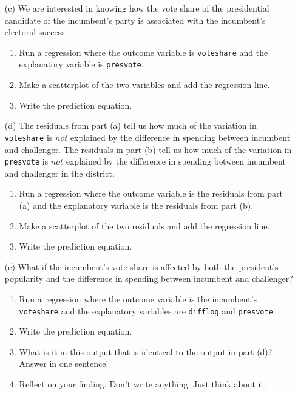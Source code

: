 \documentclass[12pt,letterpaper]{article}
\begin{document}
\begin{enumerate}
\newpage	
\item [(c)] We are interested in knowing how the vote share of the presidential candidate of the incumbent's party is associated with the incumbent's electoral success.
	\begin{enumerate}
		\item Run a regression where the outcome variable is \texttt{voteshare} and the explanatory variable is \texttt{presvote}.
		\item Make a scatterplot of the two variables and add the regression line. 
		\item Write the prediction equation.
	\end{enumerate}
	
	\vspace{7cm}
	
\item [(d)] The residuals from part (a) tell us how much of the variation in \texttt{voteshare} is $not$ explained by the difference in spending between incumbent and challenger. The residuals in part (b) tell us how much of the variation in \texttt{presvote} is $not$ explained by the difference in spending between incumbent and challenger in the district.
	\begin{enumerate}
		\item Run a regression where the outcome variable is the residuals from part (a) and the explanatory variable is the residuals from part (b).
		\item Make a scatterplot of the two residuals and add the regression line. 
		\item Write the prediction equation.
	\end{enumerate}
	
\newpage	
\item [(e)] What if the incumbent's vote share is affected by both the president's popularity and the difference in spending between incumbent and challenger? 
	\begin{enumerate}
		\item Run a regression where the outcome variable is the incumbent's \texttt{voteshare} and the explanatory variables are \texttt{difflog} and \texttt{presvote}.
		\item Write the prediction equation.
		\item What is it in this output that is identical to the output in part (d)? Answer in one sentence!
		\item Reflect on your finding. Don't write anything. Just think about it.
	\end{enumerate}
\end{enumerate}
\end{document}
